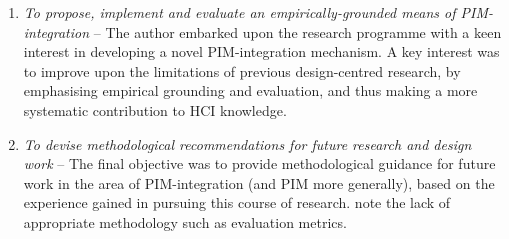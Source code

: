 \begin{enumerate}
\item \textit{To propose, implement and evaluate an empirically-grounded means of PIM-integration} -- The author embarked upon the research programme with a keen interest in developing a novel PIM-integration mechanism.  A key interest was to improve upon the limitations of previous design-centred research, by emphasising empirical grounding and evaluation, and thus making a more systematic contribution to HCI knowledge.
 
\item \textit{To devise methodological recommendations for future research and design work } -- The final objective was to provide methodological guidance for future work in the area of PIM-integration (and PIM more generally), based on the experience gained in pursuing this course of research.  \citet{Whittaker-rta:00} note the lack of appropriate methodology such as evaluation metrics.


\end{enumerate}
